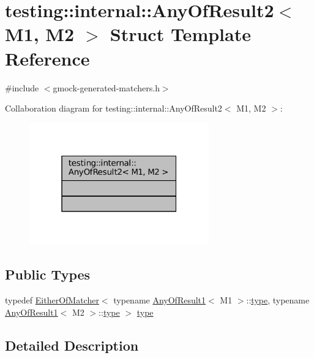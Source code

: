 \hypertarget{structtesting_1_1internal_1_1AnyOfResult2}{}\section{testing\+:\+:internal\+:\+:Any\+Of\+Result2$<$ M1, M2 $>$ Struct Template Reference}
\label{structtesting_1_1internal_1_1AnyOfResult2}


{\ttfamily \#include $<$gmock-\/generated-\/matchers.\+h$>$}



Collaboration diagram for testing\+:\+:internal\+:\+:Any\+Of\+Result2$<$ M1, M2 $>$\+:
\nopagebreak
\begin{figure}[H]
\begin{center}
\leavevmode
\includegraphics[width=220pt]{structtesting_1_1internal_1_1AnyOfResult2__coll__graph}
\end{center}
\end{figure}
\subsection*{Public Types}
\begin{DoxyCompactItemize}
\item 
typedef \hyperlink{classtesting_1_1internal_1_1EitherOfMatcher}{Either\+Of\+Matcher}$<$ typename \hyperlink{structtesting_1_1internal_1_1AnyOfResult1}{Any\+Of\+Result1}$<$ M1 $>$\+::\hyperlink{structtesting_1_1internal_1_1AnyOfResult2_a6d9eba508021f8e652c7c154a649073f}{type}, typename \hyperlink{structtesting_1_1internal_1_1AnyOfResult1}{Any\+Of\+Result1}$<$ M2 $>$\+::\hyperlink{structtesting_1_1internal_1_1AnyOfResult2_a6d9eba508021f8e652c7c154a649073f}{type} $>$ \hyperlink{structtesting_1_1internal_1_1AnyOfResult2_a6d9eba508021f8e652c7c154a649073f}{type}
\end{DoxyCompactItemize}


\subsection{Detailed Description}

